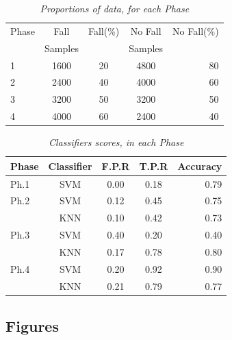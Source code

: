 \documentclass[10pt, conference, compsocconf]{IEEEtran}
\begin{document}
\begin{table}[ht]
\caption{\it Proportions of data, for each Phase}
\label{Proportions}
\begin{center}
\begin{small}
\begin{sc}
\begin{tabular}{|l|c|c|c|r|}
\hline
Phase & Fall & Fall(\%) & No Fall & No Fall(\%) \\
      & Samples &        & Samples &            \\ 
\hline
1    & 1600 & 20 & 4800 & 80 \\
\hline
2    & 2400 & 40 & 4000 & 60 \\
\hline
3    & 3200 & 50 & 3200 & 50 \\
\hline
4    & 4000 & 60 & 2400 & 40 \\
\hline
\end{tabular}
\end{sc}
\end{small}
\end{center}
\vskip 0.1in
\end{table}

\begin{table}[t]
\caption{\it Classifiers scores, in each Phase}
\label{Scores}
\vskip 0.1in
\begin{center}
\begin{small}
\begin{sc}
\begin{tabular}{|l|c|c|c|r|}
\hline
Phase & Classifier & F.P.R & T.P.R & Accuracy\\
\hline
Ph.1    & SVM & 0.00 & 0.18 & 0.79 \\
\hline
Ph.2    & SVM & 0.12 & 0.45 & 0.75 \\
     & KNN & 0.10 & 0.42 & 0.73 \\
\hline
Ph.3    & SVM & 0.40 & 0.20 & 0.40 \\
	 & KNN & 0.17 & 0.78 & 0.80 \\
\hline
Ph.4    & SVM & 0.20 & 0.92 & 0.90 \\
	 & KNN & 0.21 & 0.79 & 0.77 \\
\hline
\end{tabular}
\end{sc}
\end{small}
\end{center}
\vskip -0.3in
\end{table}

\subsection{Figures}
\end{document}
